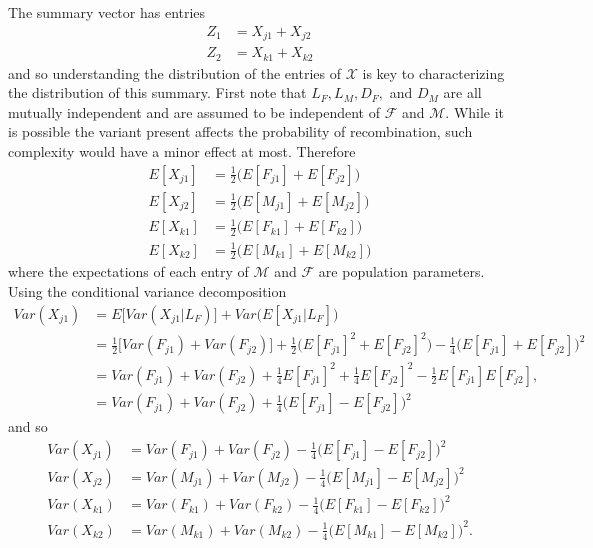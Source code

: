 \documentclass{article}
\begin{document}
The summary vector has entries
\begin{align*}
  Z_1 & = X_{j1} + X_{j2} \\
  Z_2 & = X_{k1} + X_{k2}
\end{align*}
and so understanding the distribution of the entries of $\mathcal{X}$ is key to characterizing the distribution of this summary. First note that $L_F, L_M, D_F,$ and $D_M$ are all mutually independent and are assumed to be independent of $\mathcal{F}$ and $\mathcal{M}$. While it is possible the variant present affects the probability of recombination, such complexity would have a minor effect at most. Therefore
\begin{align}
  E[X_{j1}] & =  \frac{1}{2} \Big ( E[F_{j1}] + E[F_{j2}] \Big ) \label{eq:Exj1}\\ 
  E[X_{j2}] & =  \frac{1}{2} \Big ( E[M_{j1}] + E[M_{j2}] \Big ) \label{eq:Exj2} \\ 
  E[X_{k1}] & =  \frac{1}{2} \Big ( E[F_{k1}] + E[F_{k2}] \Big ) \label{eq:Exk1} \\ 
  E[X_{k2}] & =  \frac{1}{2} \Big ( E[M_{k1}] + E[M_{k2}] \Big ) \label{eq:Exk2} 
\end{align}
where the expectations of each entry of $\mathcal{M}$ and $\mathcal{F}$ are population parameters. Using the conditional variance decomposition
\begin{align*}
  Var(X_{j1}) & = E \Big [ Var(X_{j1} | L_F) \Big ] + Var \Big ( E[X_{j1} | L_F] \Big ) \\
              & = \frac{1}{2} \Big [ Var(F_{j1}) + Var(F_{j2}) \Big ] + \frac{1}{2} \Big ( E[F_{j1}]^2 + E[F_{j2}]^2 \Big ) - \frac{1}{4} \Big ( E[F_{j1}] + E[F_{j2}] \Big )^2 \\
              & = Var(F_{j1}) + Var(F_{j2}) + \frac{1}{4} E[F_{j1}]^2 + \frac{1}{4} E[F_{j2}]^2 - \frac{1}{2} E[F_{j1}] E[F_{j2}], \\
              & = Var(F_{j1}) + Var(F_{j2}) + \frac{1}{4} \Big ( E[F_{j1}] - E[F_{j2}] \Big )^2
\end{align*}
and so
\begin{align}
  Var(X_{j1}) & = Var(F_{j1}) + Var(F_{j2}) - \frac{1}{4} \Big ( E[F_{j1}] - E[F_{j2}] \Big )^2 \label{eq:varxj1} \\
  Var(X_{j2}) & = Var(M_{j1}) + Var(M_{j2}) - \frac{1}{4} \Big ( E[M_{j1}] - E[M_{j2}] \Big )^2 \label{eq:varxj2} \\
  Var(X_{k1}) & = Var(F_{k1}) + Var(F_{k2}) - \frac{1}{4} \Big ( E[F_{k1}] - E[F_{k2}] \Big )^2 \label{eq:varxk1} \\
  Var(X_{k2}) & = Var(M_{k1}) + Var(M_{k2}) - \frac{1}{4} \Big ( E[M_{k1}] - E[M_{k2}] \Big )^2 \label{eq:varxk2}.
\end{align}
\end{document}
